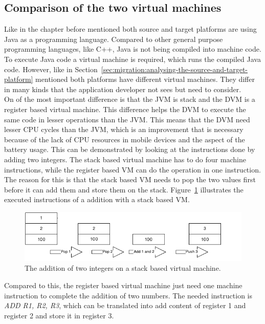 \subsection{Comparison of the two virtual machines}
\label{sec:migration:comparison-of-the-two-virtual-machines}
Like in the chapter before mentioned both source and target platforms are using Java as a programming language.
Compared to other general purpose programming languages, like C++, Java is not being compiled into machine code.
To execute Java code a virtual machine is required, which runs the compiled Java code.
However, like in Section~\ref{sec:migration:analysing-the-source-and-target-platform} mentioned both platforms have different virtual machines.
They differ in many kinds that the application developer not sees but need to consider.
\\
On of the most important difference is that the JVM is stack and the DVM is a register based virtual machine.
This difference helps the DVM to execute the same code in lesser operations than the JVM.
This means that the DVM need lesser CPU cycles than the JVM, which is an improvement that is necessary because of the lack of CPU resources in mobile devices and the aspect of the battery usage.
This can be demonstrated by looking at the instructions done by adding two integers.
The stack based virtual machine has to do four machine instructions, while the register based VM can do the operation in one instruction.
The reason for this is that the stack based VM needs to pop the two values first before it can add them and store them on the stack.
Figure~\ref{fig:stack-based-addition} illustrates the executed instructions of a addition with a stack based VM.
\begin{figure}[h]
\begin{center}
\includegraphics[scale=0.65]{images/stack-based-addition.png} 
\caption{The addition of two integers on a stack based virtual machine.}
\label{fig:stack-based-addition}
\end{center}
\end{figure}
Compared to this, the register based virtual machine just need one  machine instruction to complete the addition of two numbers.
The needed instruction is \textit{ADD R1, R2, R3}, which can be translated into add content of register 1 and register 2 and store it in register 3.
